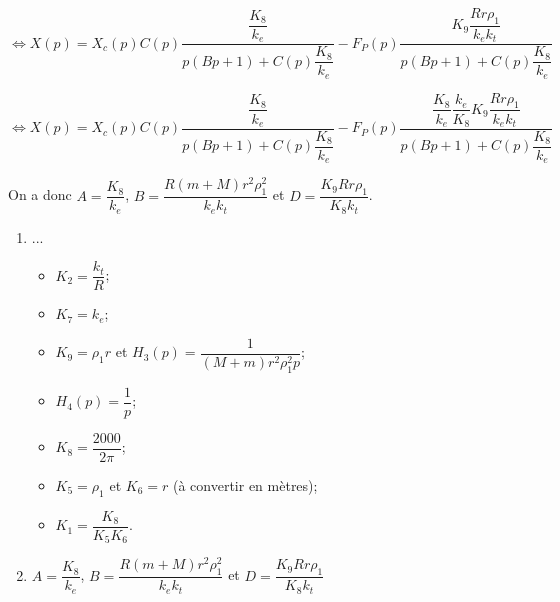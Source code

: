 \begin{corrigebox}
$\Leftrightarrow X(p)
=
X_c(p) C(p)\dfrac{
\dfrac{K_8}{k_e}}{
p\left(B p +  1\right) 
 + C(p) \dfrac{K_8 }{k_e}
 }
- F_P(p)\dfrac{K_9\dfrac{Rr\rho_1}{  k_ek_t}}{
p\left(
B  p
 + 1\right)
 + C(p)\dfrac{K_8}{  k_e} }
$

$\Leftrightarrow X(p)
=
X_c(p) C(p)\dfrac{
\dfrac{K_8}{k_e}}{
p\left(B p +  1\right) 
 + C(p) \dfrac{K_8 }{k_e}
 }
- F_P(p)\dfrac{ \dfrac{K_8}{  k_e} \dfrac{  k_e}{K_8}K_9\dfrac{Rr\rho_1}{  k_ek_t}}{
p\left(
B  p
 + 1\right)
 + C(p)\dfrac{K_8}{  k_e} }
$

On a donc $A=\dfrac{K_8}{k_e}$, $B=\dfrac{R\left(m+M\right)r^2\rho_1^2}{k_ek_t}$ et 
$D = \dfrac{ K_9 Rr\rho_1}{  K_8k_t}$.

\begin{enumerate}
\item ...
\begin{itemize}
\item $K_2 = \dfrac{k_t}{R}$;
\item $K_7 = k_e$;
\item $K_9 = \rho_1 r$ et $H_3(p)=\dfrac{1}{\left(M+m\right)r^2\rho_1^2 p}$;
\item $H_4(p)=\dfrac{1}{p}$; 
\item $K_8  = \dfrac{2000}{2\pi}$;
\item $K_5=\rho_1$ et $K_6=r$ (à convertir en mètres);
\item $K_1 =\dfrac{K_8}{K_5 K_6}$.
\end{itemize}
\item $A=\dfrac{K_8}{k_e}$, $B=\dfrac{R\left(m+M\right)r^2\rho_1^2}{k_ek_t}$ et 
$D = \dfrac{ K_9 Rr\rho_1}{  K_8k_t}$
\end{enumerate}
\end{corrigebox}
